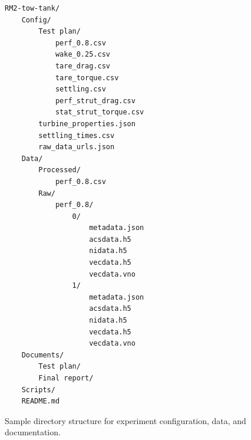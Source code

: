 \documentclass[12pt,letterpaper]{scrreprt}
\begin{document}
\begin{appendices}
\begin{figure}
\begin{verbatim}
RM2-tow-tank/
    Config/
        Test plan/
            perf_0.8.csv
            wake_0.25.csv
            tare_drag.csv
            tare_torque.csv
            settling.csv
            perf_strut_drag.csv
            stat_strut_torque.csv
        turbine_properties.json
        settling_times.csv
        raw_data_urls.json
    Data/
        Processed/
            perf_0.8.csv
        Raw/
            perf_0.8/
                0/
                    metadata.json
                    acsdata.h5
                    nidata.h5
                    vecdata.h5
                    vecdata.vno
                1/    
                    metadata.json
                    acsdata.h5
                    nidata.h5
                    vecdata.h5
                    vecdata.vno
    Documents/
        Test plan/
        Final report/
    Scripts/
    README.md
\end{verbatim}
\caption{Sample directory structure for experiment configuration, data, and
documentation.} \label{fig-dir_structure}
\end{figure}


\end{appendices}
\end{document}
